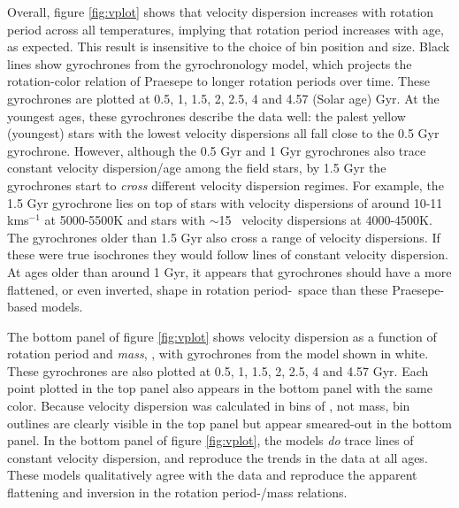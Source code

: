 Overall, figure \ref{fig:vplot} shows that velocity dispersion increases with
rotation period across all temperatures, implying that rotation period
increases with age, as expected.
This result is insensitive to the choice of bin position and size.
Black lines show gyrochrones from the \citet{angus2019} gyrochronology model,
which projects the rotation-color relation of Praesepe to longer rotation
periods over time.
These gyrochrones are plotted at 0.5, 1, 1.5, 2, 2.5, 4 and 4.57 (Solar age)
Gyr.
At the youngest ages, these gyrochrones describe the data well: the palest
yellow (youngest) stars with the lowest velocity dispersions all fall close to
the 0.5 Gyr gyrochrone.
However, although the 0.5 Gyr and 1 Gyr gyrochrones also trace constant
velocity dispersion/age among the field stars, by 1.5 Gyr the gyrochrones
start to {\it cross} different velocity dispersion regimes.
For example, the 1.5 Gyr gyrochrone lies on top of stars with velocity
dispersions of around 10-11 kms$^{-1}$ at 5000-5500K and stars with $\sim$15
\kms\ velocity dispersions at 4000-4500K.
The gyrochrones older than 1.5 Gyr also cross a range of velocity dispersions.
If these were true isochrones they would follow lines of constant velocity
dispersion.
At ages older than around 1 Gyr, it appears that gyrochrones should have a
more flattened, or even inverted, shape in rotation period-\teff\ space than
these Praesepe-based models.

The bottom panel of figure \ref{fig:vplot} shows velocity dispersion as a
function of rotation period and {\it mass}, \citep[from][]{berger2020}, with
gyrochrones from the \citet{spada2019} model shown in white.
These gyrochrones are also plotted at 0.5, 1, 1.5, 2, 2.5, 4 and 4.57 Gyr.
Each point plotted in the top panel also appears in the bottom panel with the
same color.
Because velocity dispersion was calculated in bins of \teff, not mass, bin
outlines are clearly visible in the top panel but appear smeared-out in the
bottom panel.
In the bottom panel of figure \ref{fig:vplot}, the \citet{spada2019} models
{\it do} trace lines of constant velocity dispersion, and reproduce the trends
in the data at all ages.
These models qualitatively agree with the data and reproduce the apparent
flattening and inversion in the rotation period-\teff/mass relations.

